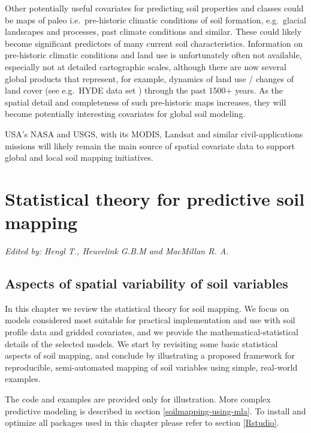 \documentclass[graybox,natbib,nospthms,UStrade]{svmono}
\begin{document}
Other potentially useful covariates for predicting soil properties and
classes could be maps of paleo i.e.~pre-historic climatic
conditions of soil formation, e.g.~glacial landscapes and processes,
past climate conditions and similar. These could likely become
significant predictors of many current soil characteristics. Information
on pre-historic climatic conditions and land use is unfortunately often
not available, especially not at detailed cartographic scales, although
there are now several global products that represent, for example,
dynamics of land use / changes of land cover (see e.g.~HYDE data set \citep{klein2011hyde})
through the past 1500+ years. As the spatial detail and completeness of
such pre-historic maps increases, they will become potentially
interesting covariates for global soil modeling.

USA's NASA and USGS, with its MODIS, Landsat and similar
civil-applications missions will likely
remain the main source of spatial covariate data to support global
and local soil mapping initiatives.

\hypertarget{statistical-theory}{%
\chapter{Statistical theory for predictive soil mapping}\label{statistical-theory}}

\emph{Edited by: Hengl T., Heuvelink G.B.M and MacMillan R. A.}

\hypertarget{aspects-variability}{%
\section{Aspects of spatial variability of soil variables}\label{aspects-variability}}

In this chapter we review the statistical theory for soil
mapping. We focus on models considered most suitable for practical
implementation and use with soil profile data and gridded covariates,
and we provide the mathematical-statistical details of the selected
models. We start by revisiting some basic statistical aspects of soil
mapping, and conclude by illustrating a proposed framework for reproducible,
semi-automated mapping of soil variables using simple, real-world
examples.

The code and examples are provided only for illustration. More complex predictive modeling
is described in section \ref{soilmapping-using-mla}. To install and optimize
all packages used in this chapter please refer to section \ref{Rstudio}.
\end{document}
